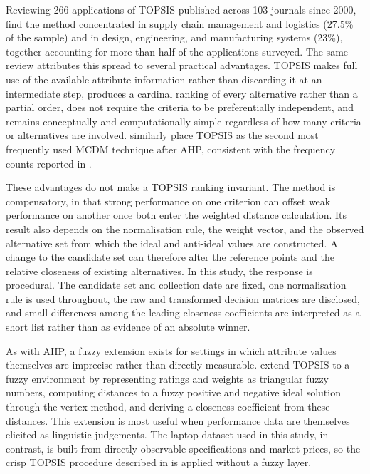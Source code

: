 Reviewing 266 applications of TOPSIS published across 103 journals since 2000,
\textcite{behzadian_state--art_2012} find the method concentrated in supply chain management and
logistics (27.5\% of the sample) and in design, engineering, and manufacturing systems (23\%),
together accounting for more than half of the applications surveyed. The same review attributes
this spread to several practical advantages. TOPSIS makes full use of the available attribute
information rather than discarding it at an intermediate step, produces a cardinal ranking of every
alternative rather than a partial order, does not require the criteria to be preferentially
independent, and remains conceptually and computationally simple regardless of how many criteria
or alternatives are involved. \textcite{zyoud_bibliometric-based_2017} similarly place TOPSIS as
the second most frequently used MCDM technique after AHP, consistent with the frequency counts
reported in .

These advantages do not make a TOPSIS ranking invariant. The method is compensatory, in that
strong performance on one criterion can offset weak performance on another once both enter the
weighted distance calculation. Its result also depends on the normalisation rule, the weight
vector, and the observed alternative set from which the ideal and anti-ideal values are
constructed. A change to the candidate set can therefore alter the reference points and the
relative closeness of existing alternatives. In this study, the response is procedural. The
candidate set and collection date are fixed, one normalisation rule is used throughout, the raw
and transformed decision matrices are disclosed, and small differences among the leading closeness
coefficients are interpreted as a short list rather than as evidence of an absolute winner.

As with AHP, a fuzzy extension exists for settings in which attribute values themselves are
imprecise rather than directly measurable. \textcite{chen_extensions_2000} extend TOPSIS to a fuzzy
environment by representing ratings and weights as triangular fuzzy numbers, computing distances to
a fuzzy positive and negative ideal solution through the vertex method, and deriving a closeness
coefficient from these distances. This extension is most useful when performance data are
themselves elicited as linguistic judgements. The laptop dataset used in this study, in contrast,
is built from directly observable specifications and market prices, so the crisp TOPSIS procedure
described in  is applied without a fuzzy layer.

